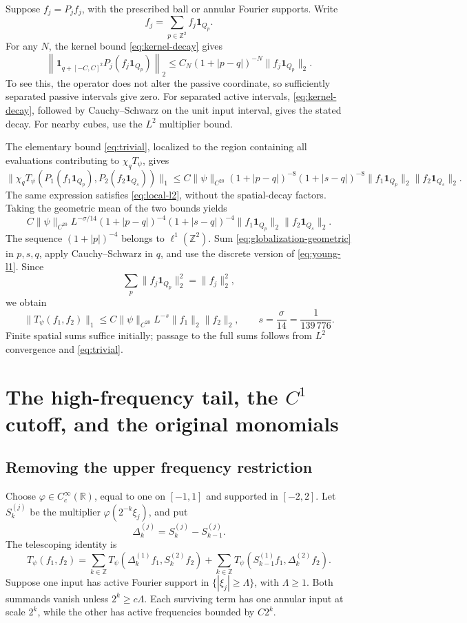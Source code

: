 \documentclass[11pt,a4paper]{article}
\newcommand{\R}{\mathbb R}
\newcommand{\Z}{\mathbb Z}
\newcommand{\ind}{\mathbf 1}
\begin{document}
Suppose $f_j=P_jf_j$, with the prescribed ball or annular Fourier supports.
Write
\[
f_j=\sum_{p\in\Z^2}f_j\ind_{Q_p}.
\]
For any $N$, the kernel bound \eqref{eq:kernel-decay} gives
\[
\left\|\ind_{q+[-C,C]^2}P_j(f_j\ind_{Q_p})\right\|_2
\leq C_N(1+|p-q|)^{-N}\|f_j\ind_{Q_p}\|_2.
\tag{7.4}\label{eq:spatial-tail}
\]
To see this, the operator does not alter the passive coordinate, so
sufficiently separated passive intervals give zero. For separated active
intervals, \eqref{eq:kernel-decay}, followed by Cauchy--Schwarz on the unit
input interval, gives the stated decay. For nearby cubes, use the $L^2$
multiplier bound.

The elementary bound \eqref{eq:trivial}, localized to the region containing
all evaluations contributing to $\chi_qT_\psi$, gives
\[
\|\chi_qT_\psi(P_1(f_1\ind_{Q_p}),P_2(f_2\ind_{Q_s}))\|_1
\leq C\|\psi\|_{C^{20}}
(1+|p-q|)^{-8}(1+|s-q|)^{-8}
\|f_1\ind_{Q_p}\|_2\|f_2\ind_{Q_s}\|_2.
\tag{7.5}\label{eq:globalization-trivial}
\]
The same expression satisfies \eqref{eq:local-l2}, without the
spatial-decay factors. Taking the geometric mean of the two bounds yields
\[
C\|\psi\|_{C^{20}}L^{-\sigma/14}
(1+|p-q|)^{-4}(1+|s-q|)^{-4}
\|f_1\ind_{Q_p}\|_2\|f_2\ind_{Q_s}\|_2.
\tag{7.6}\label{eq:globalization-geometric}
\]
The sequence $(1+|p|)^{-4}$ belongs to $\ell^1(\Z^2)$. Sum
\eqref{eq:globalization-geometric} in $p,s,q$, apply Cauchy--Schwarz in $q$,
and use the discrete version of \eqref{eq:young-l1}. Since
\[
\sum_p\|f_j\ind_{Q_p}\|_2^2=\|f_j\|_2^2,
\]
we obtain
\[
\|T_\psi(f_1,f_2)\|_1
\leq C\|\psi\|_{C^{20}}L^{-s}\|f_1\|_2\|f_2\|_2,
\qquad s=\frac{\sigma}{14}=\frac1{139\,776}.
\tag{7.7}\label{eq:global-annular}
\]
Finite spatial sums suffice initially; passage to the full sums follows
from $L^2$ convergence and \eqref{eq:trivial}.

\section{The high-frequency tail, the \texorpdfstring{$C^1$}{C1} cutoff, and the original monomials}

\subsection{Removing the upper frequency restriction}

Choose $\varphi\in C_c^\infty(\R)$, equal to one on $[-1,1]$ and supported
in $[-2,2]$. Let $S_k^{(j)}$ be the multiplier
$\varphi(2^{-k}\xi_j)$, and put
\[
\Delta_k^{(j)}=S_k^{(j)}-S_{k-1}^{(j)}.
\]
The telescoping identity is
\[
T_\psi(f_1,f_2)
=\sum_{k\in\Z}T_\psi(\Delta_k^{(1)}f_1,S_k^{(2)}f_2)
+\sum_{k\in\Z}T_\psi(S_{k-1}^{(1)}f_1,\Delta_k^{(2)}f_2).
\tag{8.1}\label{eq:telescoping}
\]
Suppose one input has active Fourier support in
$\{|\xi_j|\geq\Lambda\}$, with $\Lambda\geq1$. Both summands vanish unless
$2^k\geq c\Lambda$. Each surviving term has one annular input at scale
$2^k$, while the other has active frequencies bounded by $C2^k$.
\end{document}
